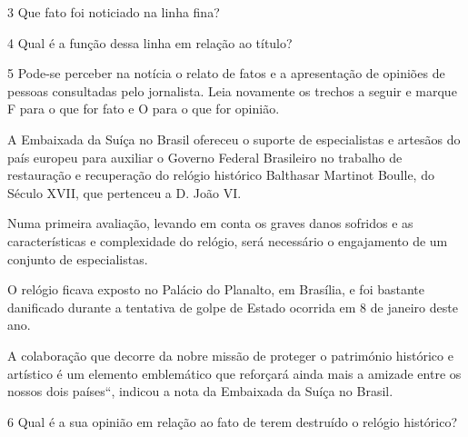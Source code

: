 \pagebreak
\num{3} Que fato foi noticiado na linha fina?


\num{4} Qual é a função dessa linha em relação ao título?


\num{5} Pode-se perceber na notícia o relato de fatos e a apresentação
de opiniões de pessoas consultadas pelo jornalista. Leia novamente os
trechos a seguir e marque F para o que for fato e O para o que for
opinião.


\begin{boxlist}
 A Embaixada da Suíça no Brasil ofereceu o suporte de especialistas
e artesãos do país europeu para auxiliar o Governo Federal Brasileiro no
trabalho de restauração e recuperação do relógio histórico Balthasar
Martinot Boulle, do Século XVII, que pertenceu a D. João VI.

 Numa primeira avaliação, levando em conta os graves danos sofridos
e as características e complexidade do relógio, será necessário o
engajamento de um conjunto de especialistas.

 O relógio ficava exposto no Palácio do Planalto, em Brasília, e
foi bastante danificado durante a tentativa de golpe de Estado ocorrida
em 8 de janeiro deste ano.

 A colaboração que decorre da nobre missão de proteger o património
histórico e artístico é um elemento emblemático que reforçará ainda mais
a amizade entre os nossos dois países``, indicou a nota da Embaixada da
Suíça no Brasil.
\end{boxlist}

\num{6} Qual é a sua opinião em relação ao fato de terem destruído o
relógio histórico?


